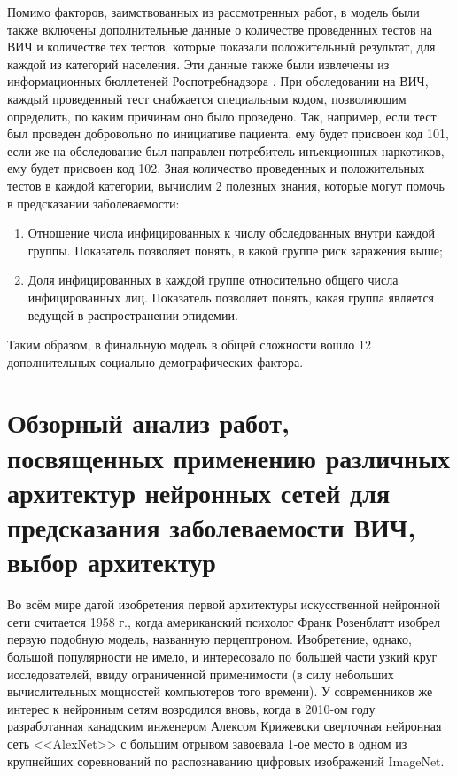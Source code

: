      Помимо факторов, заимствованных из рассмотренных работ, в модель были также включены дополнительные данные о количестве проведенных тестов на ВИЧ и количестве тех тестов, которые показали положительный результат, для каждой из категорий населения. Эти данные также были извлечены из информационных бюллетеней Роспотребнадзора \cite{Информационные_бюллетени_Роспотребнадзор}. При обследовании на ВИЧ, каждый проведенный тест снабжается специальным кодом, позволяющим определить, по каким причинам оно было проведено. Так, например, если тест был проведен добровольно по инициативе пациента, ему будет присвоен код 101, если же на обследование был направлен потребитель инъекционных наркотиков, ему будет присвоен код 102. Зная количество проведенных и положительных тестов в каждой категории, вычислим 2 полезных знания, которые могут помочь в предсказании заболеваемости:

     \begin{enumerate}
         \item Отношение числа инфицированных к числу обследованных внутри каждой группы. Показатель позволяет понять, в какой группе риск заражения выше;
         \item Доля инфицированных в каждой группе относительно общего числа инфицированных лиц. Показатель позволяет понять, какая группа является ведущей в распространении эпидемии. 
     \end{enumerate}


     Таким образом, в финальную модель в общей сложности вошло 12 дополнительных социально-демографических фактора.

\section{Обзорный анализ работ, посвященных применению различных архитектур нейронных сетей для предсказания заболеваемости ВИЧ, выбор архитектур}
\linespread{1.5}
    Во всём мире датой изобретения первой архитектуры искусственной нейронной сети считается 1958 г., когда американский психолог Франк Розенблатт изобрел первую подобную модель, названную перцептроном. Изобретение, однако, большой популярности не имело, и интересовало по большей части узкий круг исследователей, ввиду ограниченной применимости (в силу небольших вычислительных мощностей компьютеров того времени). 
    У современников же интерес к нейронным сетям возродился вновь, когда в 2010-ом году разработанная канадским инженером Алексом Крижевски сверточная нейронная сеть <<AlexNet>> с большим отрывом завоевала 1-ое место в одном из крупнейших соревнований по распознаванию цифровых изображений ImageNet. 

